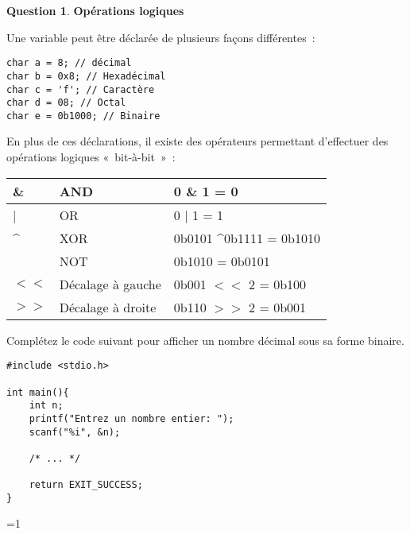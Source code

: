 \documentclass[11pt,a4paper,dvipsnames]{article}
\theoremstyle{definition}%
\newtheorem{Q}{Question}[] %
\newcounter{reponseCnt}
\begin{document}
\begin{Q} \textbf{Opérations logiques}

Une variable peut être déclarée de plusieurs façons différentes~:
\begin{verbatim}
char a = 8; // décimal
char b = 0x8; // Hexadécimal
char c = 'f'; // Caractère
char d = 08; // Octal
char e = 0b1000; // Binaire
\end{verbatim}

En plus de ces déclarations, il existe des opérateurs permettant d'effectuer des opérations logiques «~bit-à-bit~»~:
\begin{center}
	\begin{tabular}{|l|l|l|} \hline
	\& & AND & 0 \& 1 = 0\\ \hline
	| & OR & 0 | 1 = 1\\ \hline
	\textasciicircum & XOR & 0b0101 \textasciicircum 0b1111 = 0b1010\\ \hline
	\texttildelow & NOT & \texttildelow 0b1010 = 0b0101\\ \hline
	$<<$ & Décalage à gauche & 0b001 $<<$ 2 = 0b100 \\ \hline
	$>>$ & Décalage à droite & 0b110 $>>$ 2 = 0b001 \\ \hline
	\end{tabular}
\end{center}


Complétez le code suivant pour afficher un nombre décimal sous sa forme binaire.
\begin{verbatim}
#include <stdio.h>

int main(){
	int n;
	printf("Entrez un nombre entier: ");
	scanf("%i", &n);

	/* ... */

	return EXIT_SUCCESS;
}
\end{verbatim}

\ifnum\value{reponseCnt}=1
	\newpage
  
\fi
\end{Q}
\end{document}
